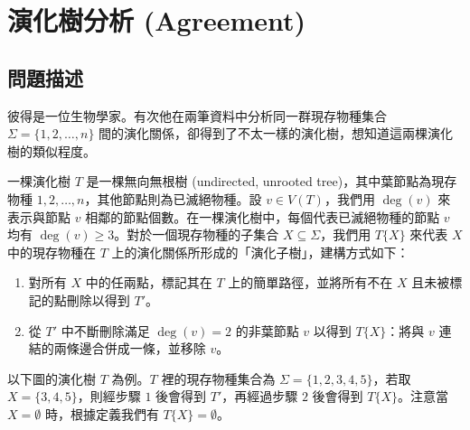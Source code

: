 \section{演化樹分析 (Agreement)}

\subsection{問題描述}

彼得是一位生物學家。有次他在兩筆資料中分析同一群現存物種集合
\(\Sigma = \{1, 2, \ldots, n\}\)
間的演化關係，卻得到了不太一樣的演化樹，想知道這兩棵演化樹的類似程度。

一棵演化樹 \(T\) 是一棵無向無根樹 (undirected, unrooted
tree)，其中葉節點為現存物種
\(1, 2, \ldots, n\)，其他節點則為已滅絕物種。設 \(v \in V(T)\)，我們用
\(\deg(v)\) 來表示與節點 \(v\)
相鄰的節點個數。在一棵演化樹中，每個代表已滅絕物種的節點 \(v\) 均有
\(\deg(v) \ge 3\)。對於一個現存物種的子集合
\(X \subseteq \Sigma\)，我們用 \(T\{X\}\) 來代表 \(X\) 中的現存物種在
\(T\) 上的演化關係所形成的「演化子樹」，建構方式如下：

\begin{enumerate}
\def\labelenumi{\arabic{enumi}.}
\tightlist
\item
  對所有 \(X\) 中的任兩點，標記其在 \(T\) 上的簡單路徑，並將所有不在
  \(X\) 且未被標記的點刪除以得到 \(T'\)。
\item
  從 \(T'\) 中不斷刪除滿足 \(\deg(v) = 2\) 的非葉節點 \(v\) 以得到
  \(T\{X\}\)：將與 \(v\) 連結的兩條邊合併成一條，並移除 \(v\)。
\end{enumerate}

\noindent 以下圖的演化樹 \(T\) 為例。\(T\) 裡的現存物種集合為
\(\Sigma = \{1, 2, 3, 4, 5\}\)，若取 \(X = \{3, 4, 5\}\)，則經步驟 \(1\)
後會得到 \(T'\)，再經過步驟 \(2\) 後會得到 \(T\{X\}\)。注意當
\(X = \emptyset\) 時，根據定義我們有 \(T\{X\} = \emptyset\)。


